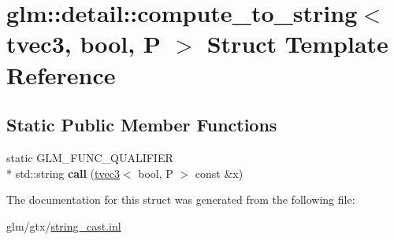 \hypertarget{structglm_1_1detail_1_1compute__to__string_3_01tvec3_00_01bool_00_01P_01_4}{\section{glm\-:\-:detail\-:\-:compute\-\_\-to\-\_\-string$<$ tvec3, bool, P $>$ Struct Template Reference}
\label{structglm_1_1detail_1_1compute__to__string_3_01tvec3_00_01bool_00_01P_01_4}
}
\subsection*{Static Public Member Functions}
\begin{DoxyCompactItemize}
\item 
\hypertarget{structglm_1_1detail_1_1compute__to__string_3_01tvec3_00_01bool_00_01P_01_4_abd2a1017b5cd9b3bcb514189dd4814b9}{static G\-L\-M\-\_\-\-F\-U\-N\-C\-\_\-\-Q\-U\-A\-L\-I\-F\-I\-E\-R \\*
std\-::string {\bfseries call} (\hyperlink{structglm_1_1tvec3}{tvec3}$<$ bool, P $>$ const \&x)}\label{structglm_1_1detail_1_1compute__to__string_3_01tvec3_00_01bool_00_01P_01_4_abd2a1017b5cd9b3bcb514189dd4814b9}

\end{DoxyCompactItemize}


The documentation for this struct was generated from the following file\-:\begin{DoxyCompactItemize}
\item 
glm/gtx/\hyperlink{string__cast_8inl}{string\-\_\-cast.\-inl}\end{DoxyCompactItemize}
